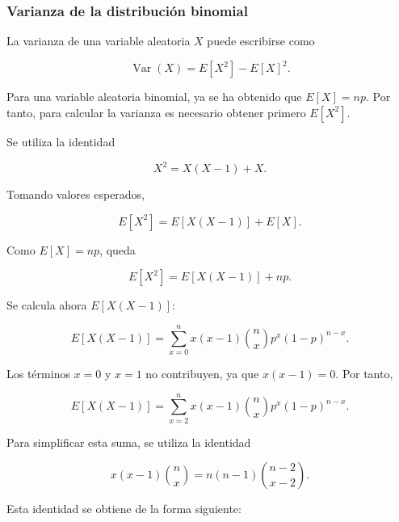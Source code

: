 \documentclass[12pt,a4paper]{article}
\begin{document}
\subsubsection{Varianza de la distribución binomial}
\label{ap:varianza_binomial}

La varianza de una variable aleatoria $X$ puede escribirse como

\begin{equation}
    \operatorname{Var}(X)=E[X^2]-E[X]^2.
    \label{eq:ap_def_varianza}
\end{equation}

Para una variable aleatoria binomial, ya se ha obtenido que $E[X]=np$. Por tanto, para calcular la varianza es necesario obtener primero $E[X^2]$.

Se utiliza la identidad

\begin{equation}
    X^2=X(X-1)+X.
\end{equation}

Tomando valores esperados,

\begin{equation}
    E[X^2]=E[X(X-1)]+E[X].
    \label{eq:ap_x2_factorial}
\end{equation}

Como $E[X]=np$, queda

\begin{equation}
    E[X^2]=E[X(X-1)]+np.
\end{equation}

Se calcula ahora $E[X(X-1)]$:

\begin{equation}
    E[X(X-1)]
    =
    \sum_{x=0}^{n}
    x(x-1)\binom{n}{x}p^x(1-p)^{n-x}.
\end{equation}

Los términos $x=0$ y $x=1$ no contribuyen, ya que $x(x-1)=0$. Por tanto,

\begin{equation}
    E[X(X-1)]
    =
    \sum_{x=2}^{n}
    x(x-1)\binom{n}{x}p^x(1-p)^{n-x}.
    \label{eq:ap_exxmenos1_suma}
\end{equation}

Para simplificar esta suma, se utiliza la identidad

\begin{equation}
    x(x-1)\binom{n}{x}
    =
    n(n-1)\binom{n-2}{x-2}.
    \label{eq:ap_identidad_varianza_binomial}
\end{equation}

Esta identidad se obtiene de la forma siguiente:
\end{document}

